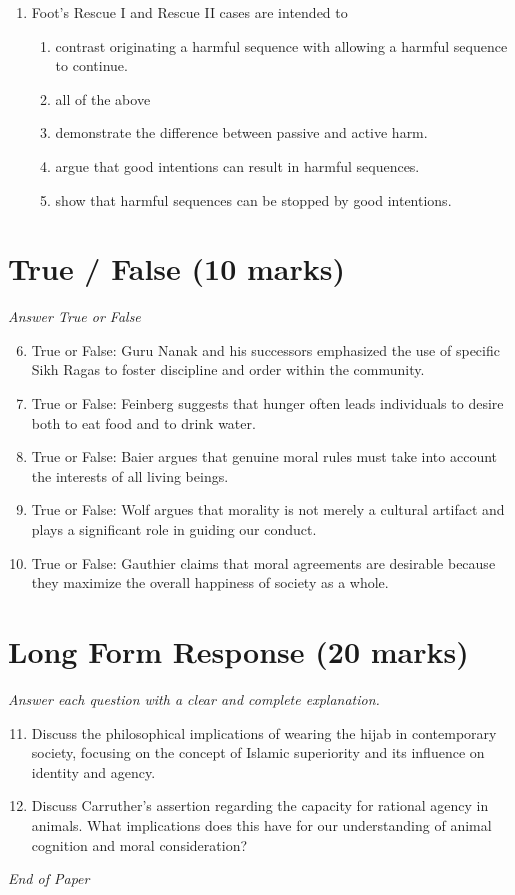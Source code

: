 \documentclass[12pt]{article}
\begin{document}
\begin{enumerate}[label=\arabic*.]
\begin{enumerate}[label=(\alph*)]
    \item Fifth century BCE
    \item Second century CE
\end{enumerate}
\item Foot's Rescue I and Rescue II cases are intended to
\begin{enumerate}[label=(\alph*)]
    \item contrast originating a harmful sequence with allowing a harmful sequence to continue.
    \item all of the above
    \item demonstrate the difference between passive and active harm.
    \item argue that good intentions can result in harmful sequences.
    \item show that harmful sequences can be stopped by good intentions.
\end{enumerate}
\end{enumerate}

\section*{True / False (10 marks)}
\textit{Answer True or False}
\begin{enumerate}[label=\arabic*.]
\setcounter{enumi}{5}
\item True or False: Guru Nanak and his successors emphasized the use of specific Sikh Ragas to foster discipline and order within the community.
\item True or False: Feinberg suggests that hunger often leads individuals to desire both to eat food and to drink water.
\item True or False: Baier argues that genuine moral rules must take into account the interests of all living beings.
\item True or False: Wolf argues that morality is not merely a cultural artifact and plays a significant role in guiding our conduct.
\item True or False: Gauthier claims that moral agreements are desirable because they maximize the overall happiness of society as a whole.
\end{enumerate}

\section*{Long Form Response (20 marks)}
\textit{Answer each question with a clear and complete explanation.}
\begin{enumerate}[label=\arabic*.]
\setcounter{enumi}{10}
\item Discuss the philosophical implications of wearing the hijab in contemporary society, focusing on the concept of Islamic superiority and its influence on identity and agency.
\item Discuss Carruther's assertion regarding the capacity for rational agency in animals. What implications does this have for our understanding of animal cognition and moral consideration?
\end{enumerate}

\vfill
\noindent\textit{End of Paper}
\end{document}
